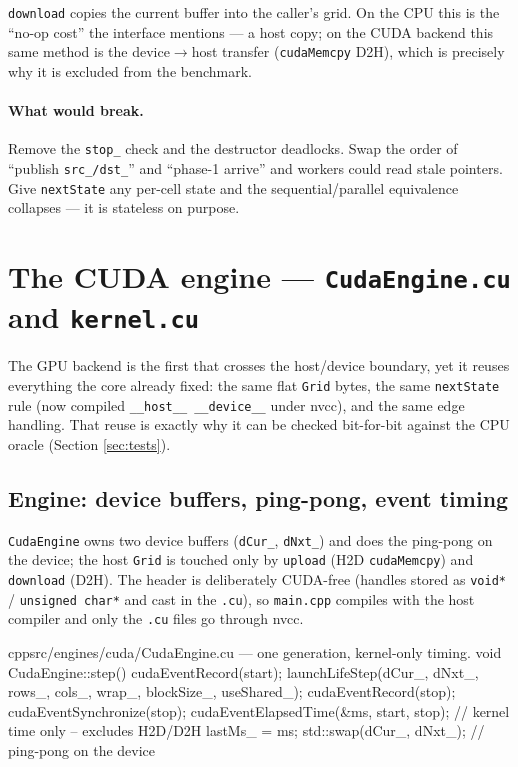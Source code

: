 \documentclass[
	english,
	letterpaper, oneside
]{article}
\begin{document}
\texttt{download} copies the current buffer into the caller's grid. On the CPU
this is the ``no-op cost'' the interface mentions --- a host copy; on the CUDA
backend this same method is the device$\rightarrow$host transfer
(\texttt{cudaMemcpy} D2H), which is precisely why it is excluded from the benchmark.

\paragraph{What would break.} Remove the \texttt{stop\_} check and the destructor
deadlocks. Swap the order of ``publish \texttt{src\_/dst\_}'' and ``phase-1
arrive'' and workers could read stale pointers. Give \texttt{nextState} any
per-cell state and the sequential/parallel equivalence collapses --- it is
stateless on purpose.

\section{The CUDA engine --- \texttt{CudaEngine.cu} and \texttt{kernel.cu}}
\label{sec:cuda}

The GPU backend is the first that crosses the host/device boundary, yet it
reuses everything the core already fixed: the same flat \texttt{Grid} bytes, the
same \texttt{nextState} rule (now compiled \texttt{\_\_host\_\_ \_\_device\_\_}
under nvcc), and the same edge handling. That reuse is exactly why it can be
checked bit-for-bit against the CPU oracle (Section \ref{sec:tests}).

\subsection{Engine: device buffers, ping-pong, event timing}

\texttt{CudaEngine} owns two device buffers (\texttt{dCur\_}, \texttt{dNxt\_})
and does the ping-pong on the device; the host \texttt{Grid} is touched only by
\texttt{upload} (H2D \texttt{cudaMemcpy}) and \texttt{download} (D2H). The header
is deliberately CUDA-free (handles stored as \texttt{void*} /
\texttt{unsigned char*} and cast in the \texttt{.cu}), so \texttt{main.cpp}
compiles with the host compiler and only the \texttt{.cu} files go through nvcc.

\begin{sourcecode}{cpp}{src/engines/cuda/CudaEngine.cu --- one generation, kernel-only timing.}
void CudaEngine::step() {
  cudaEventRecord(start);
  launchLifeStep(dCur_, dNxt_, rows_, cols_, wrap_, blockSize_, useShared_);
  cudaEventRecord(stop);
  cudaEventSynchronize(stop);
  cudaEventElapsedTime(&ms, start, stop);  // kernel time only -- excludes H2D/D2H
  lastMs_ = ms;
  std::swap(dCur_, dNxt_);                  // ping-pong on the device
}
\end{sourcecode}
\end{document}
